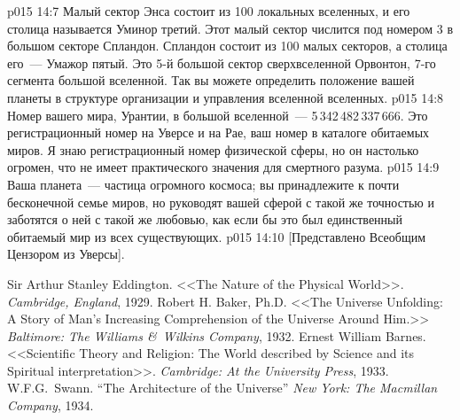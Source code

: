 \vs p015 14:7 Малый сектор Энса состоит из 100 локальных вселенных, и его столица называется Уминор третий. Этот малый сектор числится под номером 3 в большом секторе Спландон. Спландон состоит из 100 малых секторов, а столица его~--- Умажор пятый. Это 5\hyp{}й большой сектор сверхвселенной Орвонтон, 7\hyp{}го сегмента большой вселенной. Так вы можете определить положение вашей планеты в структуре организации и управления вселенной вселенных.
\vs p015 14:8 Номер вашего мира, Урантии, в большой вселенной~--- 5\,342\,482\,337\,666. Это регистрационный номер на Уверсе и на Рае, ваш номер в каталоге обитаемых миров. Я знаю регистрационный номер физической сферы, но он настолько огромен, что не имеет практического значения для смертного разума.
\vs p015 14:9 \pc Ваша планета~--- частица огромного космоса; вы принадлежите к почти бесконечной семье миров, но руководят вашей сферой с такой же точностью и заботятся о ней с такой же любовью, как если бы это был единственный обитаемый мир из всех существующих.
\vsetoff
\vs p015 14:10 [Представлено Всеобщим Цензором из Уверсы]. 
\quizlink
\begin{thebibliography}{100}
Sir Arthur Stanley Eddington.
{<<The Nature of the Physical World>>.}
{\em Cambridge, England}, 1929.
Robert H. Baker, Ph.D.
{<<The Universe Unfolding: A Story of Man's Increasing Comprehension of the Universe Around Him.>>}
{\em Baltimore: The Williams \&\ Wilkins Company}, 1932.
Ernest William Barnes.
{<<Scientific Theory and Religion: The World described by Science and its Spiritual interpretation>>.}
{\em Cambridge: At the University Press}, 1933.
W.F.G.~Swann.
{``The Architecture of the Universe''}
{\em New York: The Macmillan Company}, 1934.
\end{thebibliography}
